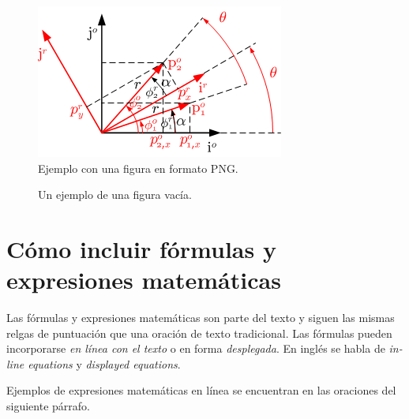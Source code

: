\documentclass[11pt,letterpaper,twoside]{report}%
\begin{document}
\begin{figure}[htbp]
\begin{center}
 \includegraphics[scale=1.5]{figs/prueba.png}
\end{center}
\vspace*{-\baselineskip}
\caption{Ejemplo con una figura en formato PNG.}
\label{fig:ejemplo_figura_png} 
\end{figure}


\begin{figure}[htbp]
\begin{center}
 \fbox{\rule{10cm}{0cm}\rule{0cm}{6cm}}
\end{center}
\vspace*{-\baselineskip}
\caption{Un ejemplo de una figura vacía.}
\label{fig:invisfig} 
\end{figure}


\section{Cómo incluir fórmulas y expresiones matemáticas}\label{sec:formulas}

Las fórmulas y expresiones matemáticas son parte del texto y siguen las mismas relgas de puntuación que una oración de texto tradicional.  Las fórmulas pueden incorporarse {\em en línea con el texto} o en forma {\em desplegada}.  En inglés se habla de {\em in-line equations} y {\em displayed equations}.

Ejemplos de expresiones matemáticas en línea se encuentran en las oraciones del siguiente párrafo.  
\end{document}
